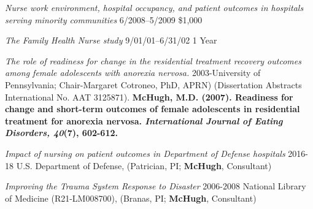 \documentclass[10pt,]{article}
\begin{document}
{{{{{{{{{{{{{\textit {Nurse work environment, hospital occupancy, and patient outcomes in hospitals serving minority communities} \hfill 6/2008--5/2009 \newline
{}	\hfill \$1,000

\textit {The Family Health Nurse study} \hfill 9/01/01--6/31/02 \newline
{} \hfill 1 Year


\vspace{4mm}


{\textit {The role of readiness for change in the residential treatment recovery outcomes among female adolescents with anorexia nervosa.}} 
2003-University of Pennsylvania; Chair-Margaret Cotroneo, PhD, APRN) (Dissertation Abstracts International No. AAT 3125871). {\textbf {\small {McHugh, M.D. (2007). Readiness for change and short-term outcomes of female adolescents in residential treatment for anorexia nervosa. {\textit {International Journal of Eating Disorders, 40}}(7), 602-612.}}}

\vspace{4mm}


{\textit {Impact of nursing on patient outcomes in Department of Defense hospitals}} \hfill 2016-18 \newline
\hspace*{0.5cm}U.S. Department of Defense, (Patrician, PI; {\textbf {McHugh}}, Consultant)

{\textit {Improving the Trauma System Response to Disaster}} \hfill 2006-2008 \newline
\hspace*{0.5cm}National Library of Medicine (R21-LM008700), (Branas, PI; {\textbf {McHugh}}, Consultant)

\vspace{4mm}

\section{\Large {}}
}}}}}}}}}}}}}
\end{document}
